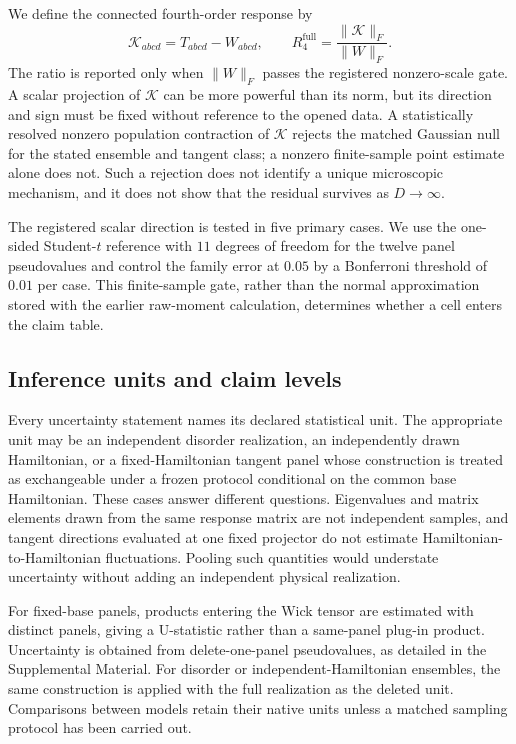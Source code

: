 We define the connected fourth-order response by
\begin{equation}
 \mathcal K_{abcd}=T_{abcd}-W_{abcd},
 \qquad
 R_4^{\mathrm{full}}=\frac{\lVert\mathcal K\rVert_F}{\lVert W\rVert_F}.
 \label{eq:wickresidual}
\end{equation}
The ratio is reported only when $\lVert W\rVert_F$ passes the registered
nonzero-scale gate.  A scalar projection of $\mathcal K$ can be more powerful
than its norm, but its direction and sign must be fixed without reference to
the opened data.  A statistically resolved nonzero population contraction of
$\mathcal K$ rejects the matched Gaussian null for the stated ensemble and
tangent class; a nonzero finite-sample point estimate alone does not.  Such a
rejection does not identify a unique microscopic mechanism, and it does not
show that the residual survives as $D\rightarrow\infty$.

The registered scalar direction is tested in five primary cases.  We use the
one-sided Student-$t$ reference with $11$ degrees of freedom for the twelve
panel pseudovalues and control the family error at $0.05$ by a Bonferroni
threshold of $0.01$ per case.  This finite-sample gate, rather than the normal
approximation stored with the earlier raw-moment calculation, determines
whether a cell enters the claim table.

\subsection{Inference units and claim levels}

Every uncertainty statement names its declared statistical unit.  The
appropriate unit may be an independent disorder realization, an independently
drawn Hamiltonian, or a fixed-Hamiltonian tangent panel whose construction is
treated as exchangeable under a frozen protocol conditional on the common
base Hamiltonian.  These cases answer different
questions.  Eigenvalues and matrix elements drawn from the same response
matrix are not independent samples, and tangent directions evaluated at one
fixed projector do not estimate Hamiltonian-to-Hamiltonian fluctuations.
Pooling such quantities would understate uncertainty without adding an
independent physical realization.

For fixed-base panels, products entering the Wick tensor are estimated with
distinct panels, giving a U-statistic rather than a same-panel plug-in product.
Uncertainty is obtained from delete-one-panel pseudovalues, as detailed in the
Supplemental Material.  For disorder or independent-Hamiltonian ensembles,
the same construction is applied with the full realization as the deleted
unit.  Comparisons between models retain their native units unless a matched
sampling protocol has been carried out.

